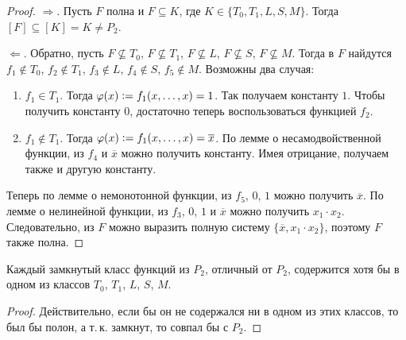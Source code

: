 \begin{proof}
    $\Rightarrow$. Пусть $F$ полна и $F \subseteq K$, где $K \in \{T_0, T_1, L, S, M\}$. Тогда $[F] \subseteq [K] = K \ne P_2$.

    $\Leftarrow$. Обратно, пусть $F \not\subseteq T_0$, $F \not\subseteq T_1$, $F \not\subseteq L$, $F \not\subseteq S$, $F \not\subseteq M$. Тогда в $F$ найдутся $f_1 \notin T_0$, $f_2 \notin T_1$, $f_3 \notin L$, $f_4 \notin S$, $f_5 \notin M$. Возможны два случая:
    \begin{enumerate}
        \item $f_1 \in T_1$. Тогда $\varphi(x) \vcentcolon = f_1(x, \ldots, x) = 1$. Так получаем константу $1$. Чтобы получить константу $0$, достаточно теперь воспользоваться функцией $f_2$.
        \item $f_1 \notin T_1$. Тогда $\varphi(x) \vcentcolon = f_1(x, \ldots, x) = \overline{x}$. По лемме о несамодвойственной функции, из $f_4$ и $\overline{x}$ можно получить константу. Имея отрицание, получаем также и другую константу.
    \end{enumerate}

    Теперь по лемме о немонотонной функции, из $f_5$, $0$, $1$ можно получить $\overline{x}$. По лемме о нелинейной функции, из $f_3$, $0$, $1$ и $\overline{x}$ можно получить $x_1 \cdot x_2$. Следовательно, из $F$ можно выразить полную систему $\{\overline{x}, x_1 \cdot x_2\}$, поэтому $F$ также полна.
\end{proof}

\begin{corollary}
    Каждый замкнутый класс функций из $P_2$, отличный от $P_2$, содержится хотя бы в одном из классов $T_0$, $T_1$, $L$, $S$, $M$.
\end{corollary}

\begin{proof}
    Действительно, если бы он не содержался ни в одном из этих классов, то был бы полон, а т.\,к. замкнут, то совпал бы с $P_2$.
\end{proof}

